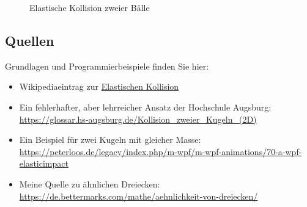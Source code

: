 \begin{figure}[H]
	\caption{Elastische Kollision zweier Bälle}\label{picImpuls03}
\end{figure}


\subsection*{Quellen}

Grundlagen und Programmierbeispiele finden Sie hier:
 
\begin{itemize}
	\item Wikipediaeintrag zur \href{https://en.wikipedia.org/wiki/Elastic_collision}{Elastischen Kollision}
    \item Ein fehlerhafter, aber lehrreicher Ansatz der Hochschule Augsburg: \url{https://glossar.hs-augsburg.de/Kollision_zweier_Kugeln_(2D)}
    \item Ein Beispiel für zwei Kugeln mit gleicher Masse: \url{https://peterloos.de/legacy/index.php/m-wpf/m-wpf-animations/70-a-wpf-elasticimpact}
    \item Meine Quelle zu ähnlichen Dreiecken: \url{https://de.bettermarks.com/mathe/aehnlichkeit-von-dreiecken/}
\end{itemize}

